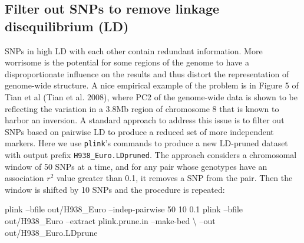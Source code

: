\documentclass[smallextended]{svjour3}       %
\newenvironment{Shaded}{\begin{snugshade}}{\end{snugshade}}
\newcommand{\DataTypeTok}[1]{\textcolor[rgb]{0.13,0.29,0.53}{#1}}
\newcommand{\StringTok}[1]{\textcolor[rgb]{0.31,0.60,0.02}{#1}}
\newcommand{\FunctionTok}[1]{\textcolor[rgb]{0.00,0.00,0.00}{#1}}
\newcommand{\OperatorTok}[1]{\textcolor[rgb]{0.81,0.36,0.00}{\textbf{#1}}}
\newcommand{\ExtensionTok}[1]{#1}
\newcommand{\NormalTok}[1]{#1}
\begin{document}
\begin{Shaded}
\end{Shaded}

\subsection{Filter out SNPs to remove linkage disequilibrium
(LD)}\label{filter-out-snps-to-remove-linkage-disequilibrium-ld}

SNPs in high LD with each other contain redundant information. More
worrisome is the potential for some regions of the genome to have a
disproportionate influence on the results and thus distort the
representation of genome-wide structure. A nice empirical example of the
problem is in Figure 5 of Tian et al (Tian et al. 2008), where PC2 of
the genome-wide data is shown to be reflecting the variation in a 3.8Mb
region of chromosome 8 that is known to harbor an inversion. A standard
approach to address this issue is to filter out SNPs based on pairwise
LD to produce a reduced set of more independent markers. Here we use
\texttt{plink}'s commands to produce a new LD-pruned dataset with output
prefix \texttt{H938\_Euro.LDpruned}. The approach considers a
chromosomal window of 50 SNPs at a time, and for any pair whose
genotypes have an association \(r^2\) value greater than 0.1, it removes
a SNP from the pair. Then the window is shifted by 10 SNPs and the
procedure is repeated:

\begin{Shaded}
\begin{Highlighting}[]
\ExtensionTok{plink}\NormalTok{ --bfile out/H938_Euro --indep-pairwise 50 10 0.1}
\ExtensionTok{plink}\NormalTok{ --bfile out/H938_Euro --extract plink.prune.in --make-bed \textbackslash{}}
\NormalTok{--out out/H938_Euro.LDprune}
\end{Highlighting}
\end{Shaded}
\end{document}
